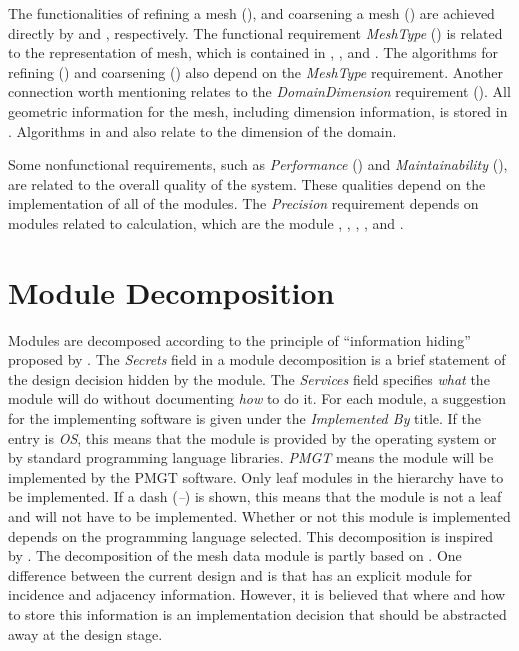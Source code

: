 \documentclass[12pt,titlepage]{article}
\begin{document}
The functionalities of refining a mesh (), and coarsening a mesh () are achieved directly by  and , respectively. The functional requirement {\em MeshType} () is related to the representation of mesh, which is contained in , , and . The algorithms for refining () and coarsening () also depend on the {\em MeshType} requirement. Another connection worth mentioning relates to the \emph{DomainDimension} requirement (). All geometric information for the mesh, including dimension information, is stored in . Algorithms in  and  also relate to the dimension of the domain. 

Some nonfunctional requirements, such as \emph{Performance} () and \emph{Maintainability} (),  are related to the overall quality of the system. These qualities depend on the implementation of all of the modules. The \emph{Precision} requirement depends on modules related to calculation, which are the module , , , ,  and . 

\section{Module Decomposition \label{AmgSecMD}}
Modules are decomposed according to the principle of ``information hiding'' proposed by \citet{Parnas1984}. The \emph{Secrets} field in a module decomposition is a brief statement of the design decision hidden by the module. The \emph{Services} field specifies \emph{what} the module will do without documenting \emph{how} to do it. For each module, a suggestion for the implementing software is given under the \emph{Implemented By} title. If the entry is \emph{OS}, this means that the module is provided by the operating system or by standard programming language libraries. \emph{PMGT} means the module will be implemented by the PMGT software. Only leaf modules in the hierarchy have to be implemented. If a dash (\emph{--}) is shown, this means that the module is not a leaf and will not have to be implemented. Whether or not this module is implemented depends on the programming language selected. This decomposition is inspired by \citet{Chen2003}. The decomposition of the mesh data module is partly based on \citet{ElSheikh2004}. One difference between the current design and \citet{ElSheikh2004} is that \citet{ElSheikh2004} has an explicit module for incidence and adjacency information. However, it is believed that where and how to store this information is an implementation decision that should be abstracted away at the design stage.
\end{document}
